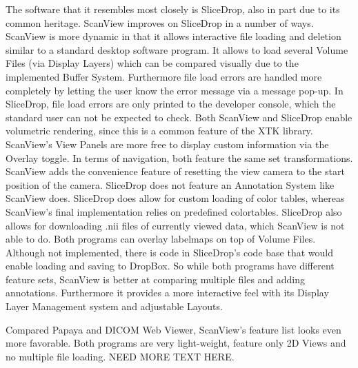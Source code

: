 \documentclass[a4paper,11pt,twoside]{article}
\begin{document}
The software that it resembles most closely is SliceDrop, also in part due to its common heritage. ScanView improves on SliceDrop in a number of ways. ScanView is more dynamic in that it allows interactive file loading and deletion similar to a standard desktop software program. It allows to load several Volume Files (via Display Layers) which can be compared visually due to the implemented Buffer System. Furthermore file load errors are handled more completely by letting the user know the error message via a message pop-up. In SliceDrop, file load errors are only printed to the developer console, which the standard user can not be expected to check. Both ScanView and SliceDrop enable volumetric rendering, since this is a common feature of the XTK library. ScanView's View Panels are more free to display custom information via the Overlay toggle. In terms of navigation, both feature the same set transformations. ScanView adds the convenience feature of resetting the view camera to the start position of the camera. SliceDrop does not feature an Annotation System like ScanView does. SliceDrop does allow for custom loading of color tables, whereas ScanView's final implementation relies on predefined colortables. SliceDrop also allows for downloading .nii files of currently viewed data, which ScanView is not able to do. Both programs can overlay labelmaps on top of Volume Files. Although not implemented, there is code in SliceDrop's code base that would enable loading and saving to DropBox. So while both programs have different feature sets, ScanView is better at comparing multiple files and adding annotations. Furthermore it provides a more interactive feel with its Display Layer Management system and adjustable Layouts.




Compared Papaya and DICOM Web Viewer, ScanView's feature list looks even more favorable. Both programs are very light-weight, feature only 2D Views and no multiple file loading. NEED MORE TEXT HERE.
\end{document}
